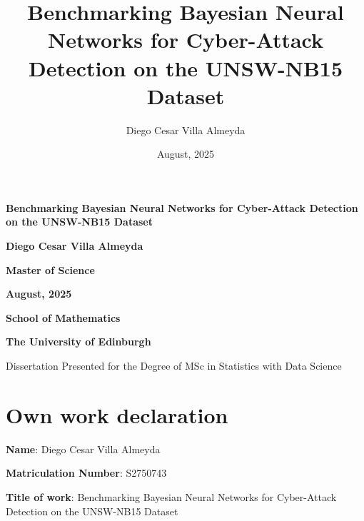 \documentclass[
  a4paper,
]{scrreprt}
\title{Benchmarking Bayesian Neural Networks for Cyber-Attack Detection
on the UNSW-NB15 Dataset}
\author{Diego Cesar Villa Almeyda}
\date{August, 2025}
\renewcommand*\contentsname{Table of contents}
\newcommand\contentsname{Table of contents}
\begin{document}
\cleardoublepage
\thispagestyle{empty}
\vspace*{2cm}  %

\begin{center}
  {\huge\bfseries Benchmarking Bayesian Neural Networks for Cyber-Attack
Detection on the UNSW-NB15 Dataset \par}
    
  \vspace{6em}

    {\Large\bfseries Diego Cesar Villa Almeyda \par}
  
  \vspace{2em}
  {\bfseries\large Master of Science \par}
  
  \vspace{1.5em}
  {\bfseries\large August, 2025 \par}
  
  \vspace{4em}

      {\bfseries\large School of Mathematics \par}
    
  {\bfseries\large The University of Edinburgh \par}
      
  \vspace{6em}
  {\small Dissertation Presented for the Degree of MSc in Statistics with Data Science \par}
\end{center}

\renewcommand*\contentsname{Table of contents}
{
\hypersetup{linkcolor=}
\setcounter{tocdepth}{2}
\tableofcontents
}


\chapter*{Own work declaration}\label{own-work-declaration}


\textbf{Name}: Diego Cesar Villa Almeyda

\textbf{Matriculation Number}: S2750743

\textbf{Title of work}: Benchmarking Bayesian Neural Networks for
Cyber-Attack Detection on the UNSW-NB15 Dataset
\end{document}
